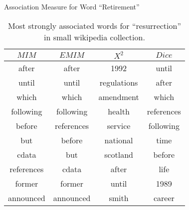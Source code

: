 \begin{table}[!htbp]
	\caption{Association Measure for Word ``Retirement''} \label{tab:retirement}
	\begin{center}
	\vspace{-5mm}
		\begin{tabular}{ c | c | c | c }
			\toprule
			$MIM$ & $EMIM$ & $X^2$ & $Dice$\\
			\midrule
after     &      after    &       1992    &        until          \\
until     &      until    &       regulations  &   after          \\
which     &      which    &       amendment    &   which          \\
following &      following &      health       &   references     \\
before    &      references &     service      &   following      \\
but       &      before     &     national     &   time           \\
cdata     &      but        &     scotland     &   before         \\
references &     cdata      &     after        &   life           \\
former     &     former     &     until        &   1989           \\
announced  &     announced  &     smith        &   career         \\
			\bottomrule
		\end{tabular}
	\caption*{\scriptsize Most strongly associated words for ``resurrection'' in small wikipedia collection.}
	 \end{center}
\end{table}

